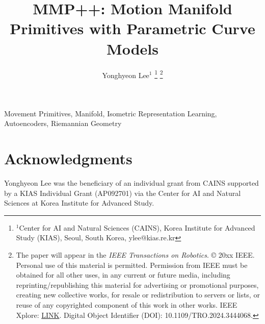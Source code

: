 \documentclass[journal]{IEEEtran}
\begin{document}
\title{MMP++: Motion Manifold Primitives with Parametric Curve Models}
\author{Yonghyeon Lee$^1$
\thanks{$^1$Center for AI and Natural Sciences (CAINS), Korea Institute for Advanced Study (KIAS), Seoul, South Korea, ylee@kias.re.kr}%
\thanks{The paper will appear in the {\it IEEE Transactions on Robotics}. © 20xx IEEE.  Personal use of this material is permitted.  Permission from IEEE must be obtained for all other uses, in any current or future media, including reprinting/republishing this material for advertising or promotional purposes, creating new collective works, for resale or redistribution to servers or lists, or reuse of any copyrighted component of this work in other works. IEEE Xplore: \href{https://ieeexplore.ieee.org/document/10637485/}{LINK}. Digital Object Identifier (DOI): 10.1109/TRO.2024.3444068.}
}



\maketitle



\begin{IEEEkeywords}
Movement Primitives, Manifold, Isometric Representation Learning, Autoencoders, Riemannian Geometry
\end{IEEEkeywords}








\section*{Acknowledgments}
Yonghyeon Lee was the beneficiary of an individual grant from CAINS supported by a KIAS Individual Grant (AP092701) via the Center for AI and Natural Sciences at Korea Institute for Advanced Study.

\end{document}

